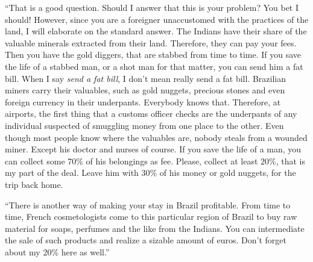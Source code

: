 \documentclass[
  12pt,
]{book}
\begin{document}
``That is a good question. Should I answer that this is your problem?
You bet I should! However, since you are a foreigner unaccustomed with
the practices of the land, I will elaborate on the standard answer. The
Indians have their share of the valuable minerals extracted from their
land. Therefore, they can pay your fees. Then you have the gold diggers,
that are stabbed from time to time. If you save the life of a stabbed
man, or a shot man for that matter, you can send him a fat bill. When I
say \emph{send a fat bill}, I don't mean really send a fat bill.
Brazilian miners carry their valuables, such as gold nuggets, precious
stones and even foreign currency in their underpants. Everybody knows
that. Therefore, at airports, the first thing that a customs officer
checks are the underpants of any individual suspected of smuggling money
from one place to the other. Even though most people know where the
valuables are, nobody steals from a wounded miner. Except his doctor and
nurses of course. If you save the life of a man, you can collect some
70\% of his belongings as fee. Please, collect at least 20\%, that is my
part of the deal. Leave him with 30\% of his money or gold nuggets, for
the trip back home.

``There is another way of making your stay in Brazil profitable. From
time to time, French cosmetologists come to this particular region of
Brazil to buy raw material for soaps, perfumes and the like from the
Indians. You can intermediate the sale of such products and realize a
sizable amount of euros. Don't forget about my 20\% here as well.''

\backmatter
\end{document}
